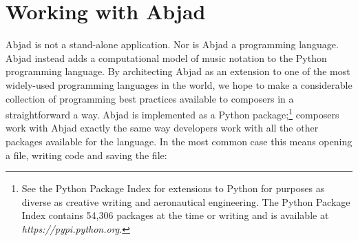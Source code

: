 \documentclass{article}
\begin{document}

\section{Working with Abjad} \label{sec:example}

Abjad is not a stand-alone application. Nor is Abjad a programming language.
Abjad instead adds a computational model of music notation to the Python programming language.
By architecting Abjad as an extension to one of the most widely-used programming languages in the world, we hope to make a considerable collection of programming best practices available to composers in a straightforward a way. Abjad is implemented as a Python package;\footnote{See the Python Package Index for extensions to Python for purposes as diverse as creative writing and aeronautical engineering. The Python Package Index contains 54,306 packages at the time or writing and is available at \textit{https://pypi.python.org}.} composers work with Abjad exactly the same way developers work with all the other packages available for the language. In the most common case this means opening a file, writing code and saving the file:
\end{document}
